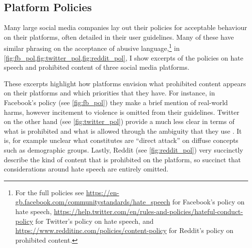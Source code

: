 \subsection{Platform Policies}

Many large social media companies lay out their policies for acceptable behaviour on their platforms, often detailed in their user guidelines.
Many of these have similar phrasing on the acceptance of abusive language,\footnote{For the full policies see \url{https://en-gb.facebook.com/communitystandards/hate_speech} for Facebook's policy on hate speech, \url{https://help.twitter.com/en/rules-and-policies/hateful-conduct-policy} for Twitter's policy on hate speech, and \url{https://www.redditinc.com/policies/content-policy} for Reddit's policy on prohibited content.} in \cref{fig:fb_pol,fig:twitter_pol,fig:reddit_pol}, I show excerpts of the policies on hate speech and prohibited content of three social media platforms.

These excerpts highlight how platforms envision what prohibited content appears on their platforms and which priorities that they have.
For instance, in Facebook's policy (see \cref{fig:fb_pol}) they make a brief mention of real-world harms, however incitement to violence is omitted from their guidelines.
Twitter on the other hand (see \cref{fig:twitter_pol}) provide a much less clear in terms of what is prohibited and what is allowed through the ambiguity that they use \citep{Kirtz:2022}.
It is, for example unclear what constitutes are ``direct attack'' on diffuse concepts such as demographic groups.
Lastly, Reddit (see \cref{fig:reddit_pol}) very succinctly describe the kind of content that is prohibited on the platform, so succinct that considerations around hate speech are entirely omitted.

